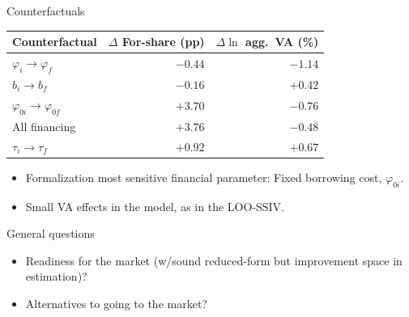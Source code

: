 \documentclass[11pt,aspectratio=169]{beamer}
\begin{document}
\begin{frame}{Counterfactuals}

\begin{center}
    \renewcommand{\arraystretch}{1.2}
    \begin{tabular}{lrr}
        \toprule
        Counterfactual & $\Delta$ For-share (pp) & $\Delta\ln$ agg.\ VA (\%) \\
        \midrule
        $\varphi_i \to \varphi_f$ & $-0.44$ & $-1.14$ \\
        $b_i \to b_f$ & $-0.16$ & $+0.42$ \\
        $\varphi_{0i} \to \varphi_{0f}$ & $+3.70$ & $-0.76$ \\
        All financing & $+3.76$ & $-0.48$ \\
        $\tau_i \to \tau_f$ & $+0.92$ & $+0.67$ \\
        \bottomrule
    \end{tabular}
\end{center}

\medskip
\begin{itemize}
  \item Formalization most sensitive financial parameter: Fixed borrowing cost, $\varphi_{0i}$.
  \item Small VA effects in the model, as in the LOO-SSIV.
\end{itemize}
\end{frame}
 

\begin{frame}{General questions}

\begin{itemize}
    \item Readiness for the market (w/sound reduced-form but improvement space in estimation)?
    \vspace{8mm}
    \item Alternatives to going to the market?
\end{itemize}

\end{frame}
 
 
\end{document}
